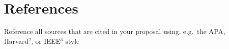 \section{References}

Reference all sources that are cited in your proposal using, e.g.\ the APA, Harvard$^{2}$, or IEEE$^{3}$ style
